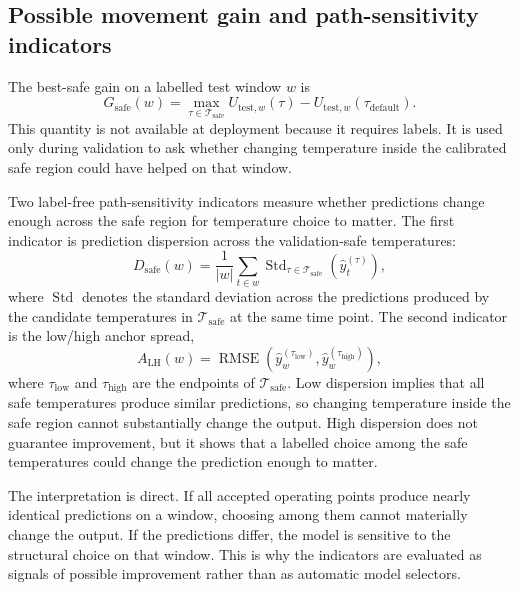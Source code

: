 \documentclass[preprint,12pt,authoryear]{elsarticle}
\begin{document}
\subsection{Possible movement gain and path-sensitivity indicators}

The best-safe gain on a labelled test window $w$ is
\begin{equation}
  G_{\mathrm{safe}}(w) =
  \max_{\tau\in\mathcal{T}_{\mathrm{safe}}}
  U_{\mathrm{test},w}(\tau)
  - U_{\mathrm{test},w}(\tau_{\mathrm{default}}).
\end{equation}
This quantity is not available at deployment because it requires labels. It is used only during validation to ask whether changing temperature inside the calibrated safe region could have helped on that window.

Two label-free path-sensitivity indicators measure whether predictions change enough across the safe region for temperature choice to matter. The first indicator is prediction dispersion across the validation-safe temperatures:
\begin{equation}
  D_{\mathrm{safe}}(w)=
  \frac{1}{|w|}\sum_{t\in w}
  \operatorname{Std}_{\tau\in\mathcal{T}_{\mathrm{safe}}}
  \left(\widehat y_t^{(\tau)}\right),
\end{equation}
where $\operatorname{Std}$ denotes the standard deviation across the predictions produced by the candidate temperatures in $\mathcal{T}_{\mathrm{safe}}$ at the same time point. The second indicator is the low/high anchor spread,
\begin{equation}
  A_{\mathrm{LH}}(w)=
  \operatorname{RMSE}\left(
  \widehat y_{w}^{(\tau_{\mathrm{low}})},
  \widehat y_{w}^{(\tau_{\mathrm{high}})}
  \right),
\end{equation}
where $\tau_{\mathrm{low}}$ and $\tau_{\mathrm{high}}$ are the endpoints of $\mathcal{T}_{\mathrm{safe}}$. Low dispersion implies that all safe temperatures produce similar predictions, so changing temperature inside the safe region cannot substantially change the output. High dispersion does not guarantee improvement, but it shows that a labelled choice among the safe temperatures could change the prediction enough to matter.

The interpretation is direct. If all accepted operating points produce nearly identical predictions on a window, choosing among them cannot materially change the output. If the predictions differ, the model is sensitive to the structural choice on that window. This is why the indicators are evaluated as signals of possible improvement rather than as automatic model selectors.
\end{document}
